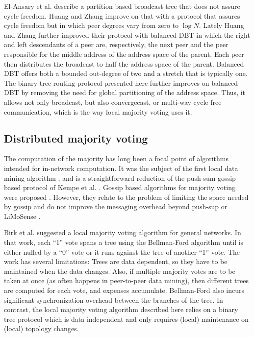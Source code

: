 \documentclass[12pt,english,journal]{elsarticle}
\numberwithin{equation}{section}
\numberwithin{figure}{section}
\theoremstyle{plain}
\theoremstyle{plain}
\begin{document}
El-Ansary et al. \citep{DHTTree1} describe a partition based broadcast
tree that does not assure cycle freedom. Huang and Zhang \citep{dhttreeJ}
improve on that with a protocol that assures cycle freedom but in
which peer degrees vary from zero to $\log N$. Lately Huang and Zhang
\citep{DHTTree2} further improved their protocol with balanced DBT
in which the right and left descendants of a peer are, respectively,
the next peer and the peer responsible for the middle address of the
address space of the parent. Each peer then distributes the broadcast
to half the address space of the parent. Balanced DBT offers both
a bounded out-degree of two and a stretch that is typically one. The
binary tree routing protocol presented here further improves on balanced
DBT by removing the need for global partitioning of the address space.
Thus, it allows not only broadcast, but also convergecast, or multi-way
cycle free communication, which is the way local majority voting uses
it.


\subsection{Distributed majority voting}

The computation of the majority has long been a focal point of algorithms
intended for in-network computation. It was the subject of the first
local data mining algorithm \citep{MajorityRulej}, and is a straightforward
reduction of the push-sum gossip based protocol of Kempe et al. \citep{KempeGossip}.
Gossip based algorithms for majority voting were proposed \citep{GossipMajority,GossipVoting}.
However, they relate to the problem of limiting the space needed by
gossip and do not improve the messaging overhead beyond push-sup or
LiMoSense \citep{dynamicGossip}. 

Birk et al. \citep{ChargeFusion} suggested a local majority voting
algorithm for general networks. In that work, each ``1'' vote spans
a tree using the Bellman-Ford algorithm until is either nulled by
a ``0'' vote or it runs against the tree of another ``1'' vote.
The work has several limitations: Trees are data dependent, so they
have to be maintained when the data changes. Also, if multiple majority
votes are to be taken at once (as often happens in peer-to-peer data
mining), then different trees are computed for each vote, and expenses
accumulate. Bellman-Ford also incurs significant synchronization overhead
between the branches of the tree. In contrast, the local majority
voting algorithm described here relies on a binary tree protocol which
is data independent and only requires (local) maintenance on (local)
topology changes. 
\end{document}

